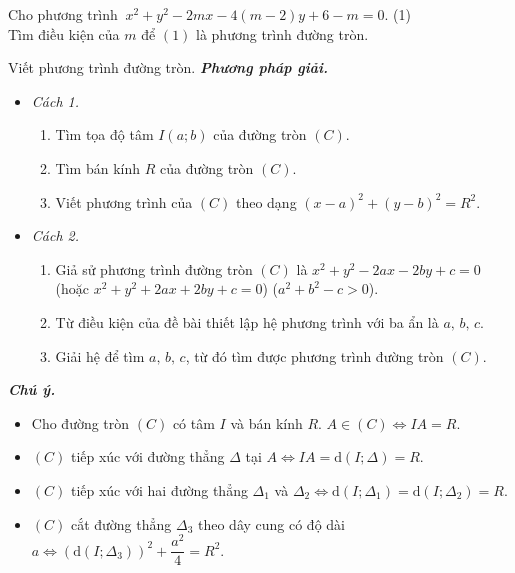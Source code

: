 \begin{vd}%
	Cho phương trình $~x^2+y^2-2mx-4(m-2)y+6-m=0$. \qquad(1)\\ Tìm điều kiện của $m$ để $(1)$ là phương trình đường tròn.
\end{vd}
\begin{dang}{Viết phương trình đường tròn.}
	\textbf{\textit{Phương pháp giải.
	}}
	\begin{itemize}
		\item \textit{Cách 1.} 
		\begin{enumerate}[-]
			\item Tìm tọa độ tâm $I\left(a;b\right)$ của đường tròn $(C)$.
			\item Tìm bán kính $R$ của đường tròn $(C)$.
			\item Viết phương trình của $(C)$ theo dạng $(x-a)^2+(y-b)^2=R^2$.
		\end{enumerate}
		\item \textit{Cách 2.} 
		\begin{enumerate}[-]
			\item Giả sử phương trình đường tròn $(C)$ là  $x^2+y^2-2ax-2by+c=0$ (hoặc $x^2+y^2+2ax+2by+c=0 $) ($a^2+b^2-c>0$).
			\item Từ điều kiện của đề bài thiết lập hệ phương trình với ba ẩn là $a,\,b,\,c$.
			\item Giải hệ để tìm $a,\,b,\,c$, từ đó tìm được phương trình đường tròn $(C)$.
		\end{enumerate}
	\end{itemize}
	\textbf{\textit{Chú ý.}}
	\begin{itemize}
		\item Cho đường tròn $(C)$ có tâm $I$ và bán kính $R$.
		$A\in (C)\Leftrightarrow IA=R$.
		\item $(C)$ tiếp xúc với đường thẳng $\Delta $ tại $A\Leftrightarrow IA=\mathrm{d}\left(I;\Delta\right)=R$.
		\item $(C)$ tiếp xúc với hai đường thẳng ${\Delta}_1$ và ${\Delta}_2\Leftrightarrow \mathrm{d}\left(I;{\Delta}_1\right)=\mathrm{d}\left(I;{\Delta}_2\right)=R$.
		\item $(C)$ cắt đường thẳng ${\Delta}_3$ theo dây cung có độ dài $a \Leftrightarrow \left(\mathrm{d}\left(I;{\Delta}_3\right)\right)^2+\dfrac{a^2}{4}=R^2$.
	\end{itemize}
\end{dang}
